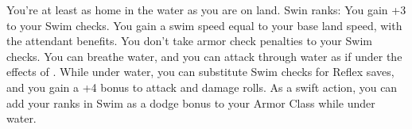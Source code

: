 \skillfeat
{You're at least as home in the water as you are on land.}
{Swin ranks:}
{You gain +3 to your Swim checks.}
{You gain a swim speed equal to your base land speed, with the attendant benefits. You don't take armor check penalties to your Swim checks.}
{You can breathe water, and you can attack through water as if under the effects of .}
{While under water, you can substitute Swim checks for Reflex saves, and you gain a +4 bonus to attack and damage rolls.}
{As a swift action, you can add your ranks in Swim as a dodge bonus to your Armor Class while under water.}